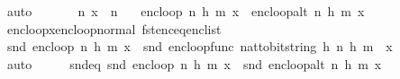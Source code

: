 \begin{isabellebody}
\ auto%
\endisatagproof
{\isafoldproof}%
%
\isadelimproof
\isanewline
%
\endisadelimproof
\isanewline
{}\isamarkupfalse%
\ \isanewline
\ \ \ {\isachardoublequoteopen}{}\ {\isacharless}{\kern0pt}\ n{\isachardoublequoteclose}\ {\isachardoublequoteopen}x\ {\isacharless}{\kern0pt}\ n{\isachardoublequoteclose}\isanewline
\ \ \ {\isachardoublequoteopen}enc{\isacharunderscore}{\kern0pt}loop\ {\isacharparenleft}{\kern0pt}n{\isacharcomma}{\kern0pt}\ h{\isacharcomma}{\kern0pt}\ m{\isacharparenright}{\kern0pt}\ x\ {\isacharequal}{\kern0pt}\ enc{\isacharunderscore}{\kern0pt}loop{\isacharunderscore}{\kern0pt}alt\ {\isacharparenleft}{\kern0pt}n{\isacharcomma}{\kern0pt}\ h{\isacharcomma}{\kern0pt}\ m{\isacharparenright}{\kern0pt}\ x{\isachardoublequoteclose}\isanewline
%
\isadelimproof
\ \ %
\endisadelimproof
%
\isatagproof
{}\isamarkupfalse%
\ enc{\isacharunderscore}{\kern0pt}loop{\isacharunderscore}{\kern0pt}x{\isacharunderscore}{\kern0pt}enc{\isacharunderscore}{\kern0pt}loop{\isacharunderscore}{\kern0pt}normal\ fst{\isacharunderscore}{\kern0pt}enc{\isacharunderscore}{\kern0pt}eq{\isacharunderscore}{\kern0pt}enc{\isacharunderscore}{\kern0pt}list\ \isanewline
{}\isamarkupfalse%
\ {\isacharminus}{\kern0pt}\ \isanewline
\ \ \isamarkupfalse%
\ {\isachardoublequoteopen}snd\ {\isacharparenleft}{\kern0pt}enc{\isacharunderscore}{\kern0pt}loop\ {\isacharparenleft}{\kern0pt}n{\isacharcomma}{\kern0pt}\ h{\isacharcomma}{\kern0pt}\ m{\isacharparenright}{\kern0pt}\ x{\isacharparenright}{\kern0pt}\ {\isacharequal}{\kern0pt}\ snd\ {\isacharparenleft}{\kern0pt}enc{\isacharunderscore}{\kern0pt}loop{\isacharunderscore}{\kern0pt}func\ {\isacharparenleft}{\kern0pt}nat{\isacharunderscore}{\kern0pt}to{\isacharunderscore}{\kern0pt}bitstring\ h{\isacharcomma}{\kern0pt}\ n{\isacharcomma}{\kern0pt}\ h{\isacharcomma}{\kern0pt}\ m{\isacharparenright}{\kern0pt}\ {\isacharbrackleft}{\kern0pt}{\isacharbrackright}{\kern0pt}\ x{\isacharparenright}{\kern0pt}{\isachardoublequoteclose}\ \isanewline
\ \ \ \ \isamarkupfalse%
\ auto\isanewline
\ \ \isamarkupfalse%
\ \isamarkupfalse%
\ snd{\isacharunderscore}{\kern0pt}eq{\isacharcolon}{\kern0pt}\ {\isachardoublequoteopen}snd\ {\isacharparenleft}{\kern0pt}enc{\isacharunderscore}{\kern0pt}loop\ {\isacharparenleft}{\kern0pt}n{\isacharcomma}{\kern0pt}\ h{\isacharcomma}{\kern0pt}\ m{\isacharparenright}{\kern0pt}\ x{\isacharparenright}{\kern0pt}\ {\isacharequal}{\kern0pt}\ snd\ {\isacharparenleft}{\kern0pt}enc{\isacharunderscore}{\kern0pt}loop{\isacharunderscore}{\kern0pt}alt\ {\isacharparenleft}{\kern0pt}n{\isacharcomma}{\kern0pt}\ h{\isacharcomma}{\kern0pt}\ m{\isacharparenright}{\kern0pt}\ x{\isacharparenright}{\kern0pt}{\isachardoublequoteclose}\ \isanewline

\end{isabellebody}
